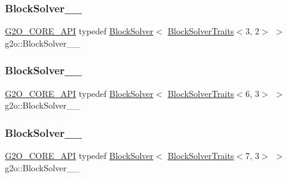 \subsubsection{\texorpdfstring{Block\+Solver\+\_\+\_}{BlockSolver\_3\_2}}
{\footnotesize\ttfamily \mbox{\hyperlink{g2o__core__api_8h_a7a8d7648d6f1e26632566f335751d064}{G2\+O\+\_\+\+C\+O\+R\+E\+\_\+\+A\+PI}} typedef \mbox{\hyperlink{classg2o_1_1_block_solver}{Block\+Solver}}$<$ \mbox{\hyperlink{structg2o_1_1_block_solver_traits}{Block\+Solver\+Traits}}$<$3, 2$>$ $>$ g2o\+::\+Block\+Solver\+\_\+\_}

\mbox{\label{namespaceg2o_ac2431e417f239680e2d2436970713e84}} 
\subsubsection{\texorpdfstring{Block\+Solver\+\_\+\_}{BlockSolver\_6\_3}}
{\footnotesize\ttfamily \mbox{\hyperlink{g2o__core__api_8h_a7a8d7648d6f1e26632566f335751d064}{G2\+O\+\_\+\+C\+O\+R\+E\+\_\+\+A\+PI}} typedef \mbox{\hyperlink{classg2o_1_1_block_solver}{Block\+Solver}}$<$ \mbox{\hyperlink{structg2o_1_1_block_solver_traits}{Block\+Solver\+Traits}}$<$6, 3$>$ $>$ g2o\+::\+Block\+Solver\+\_\+\_}

\mbox{\label{namespaceg2o_a722b0d55b4695c7968d67107aee7671c}} 
\subsubsection{\texorpdfstring{Block\+Solver\+\_\+\_}{BlockSolver\_7\_3}}
{\footnotesize\ttfamily \mbox{\hyperlink{g2o__core__api_8h_a7a8d7648d6f1e26632566f335751d064}{G2\+O\+\_\+\+C\+O\+R\+E\+\_\+\+A\+PI}} typedef \mbox{\hyperlink{classg2o_1_1_block_solver}{Block\+Solver}}$<$ \mbox{\hyperlink{structg2o_1_1_block_solver_traits}{Block\+Solver\+Traits}}$<$7, 3$>$ $>$ g2o\+::\+Block\+Solver\+\_\+\_}

\mbox{\label{namespaceg2o_adcc6ea7cf60314982bc91e7b926adf14}} 
